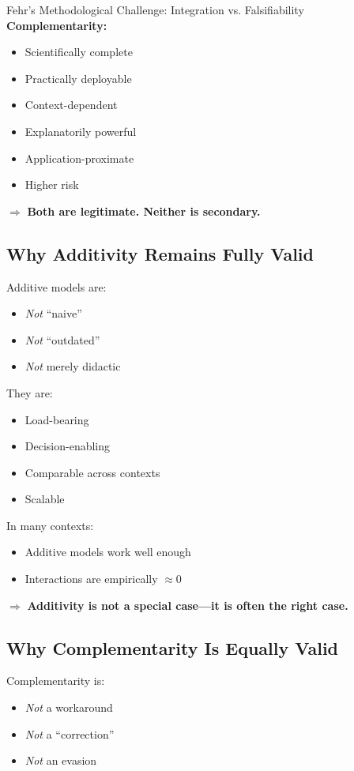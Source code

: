 \begin{chapter}{Fehr's Methodological Challenge: Integration vs. Falsifiability}
\textbf{Complementarity:}
\begin{itemize}[noitemsep]
    \item Scientifically complete
    \item Practically deployable
    \item Context-dependent
    \item Explanatorily powerful
    \item Application-proximate
    \item Higher risk
\end{itemize}

$\Rightarrow$ \textbf{Both are legitimate. Neither is secondary.}

\subsection{Why Additivity Remains Fully Valid}

Additive models are:
\begin{itemize}[noitemsep]
    \item \textit{Not} ``naive''
    \item \textit{Not} ``outdated''
    \item \textit{Not} merely didactic
\end{itemize}

They are:
\begin{itemize}[noitemsep]
    \item Load-bearing
    \item Decision-enabling
    \item Comparable across contexts
    \item Scalable
\end{itemize}

In many contexts:
\begin{itemize}[noitemsep]
    \item Additive models work well enough
    \item Interactions are empirically $\approx 0$
\end{itemize}

$\Rightarrow$ \textbf{Additivity is not a special case---it is often the right case.}

\subsection{Why Complementarity Is Equally Valid}

Complementarity is:
\begin{itemize}[noitemsep]
    \item \textit{Not} a workaround
    \item \textit{Not} a ``correction''
    \item \textit{Not} an evasion
\end{itemize}


\end{chapter}
